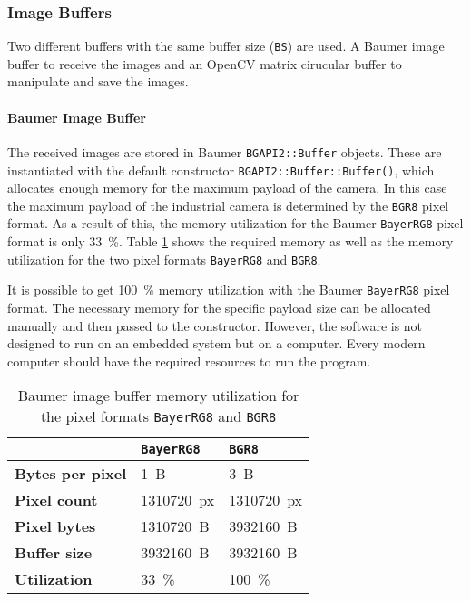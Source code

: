\subsubsection{Image Buffers}
\label{subsubsec:buffers}

Two different buffers with the same buffer size (\texttt{BS}) are used.
A Baumer image buffer to receive the images and an OpenCV matrix cirucular buffer to manipulate and save the images.

\paragraph{Baumer Image Buffer}
The received images are stored in Baumer \texttt{BGAPI2::Buffer} objects.
These are instantiated with the default constructor \texttt{BGAPI2::Buffer::Buffer()}, which allocates enough memory for the maximum payload of the camera.
In this case the maximum payload of the industrial camera is determined by the \texttt{BGR8} pixel format.
As a result of this, the memory utilization for the Baumer \texttt{BayerRG8} pixel format is only \SI{33}{\percent}.
Table \ref{tab:buffer_memory_utilization} shows the required memory as well as the memory utilization for the two pixel formats \texttt{BayerRG8} and \texttt{BGR8}.

\clearpage

It is possible to get \SI{100}{\percent} memory utilization with the Baumer \texttt{BayerRG8} pixel format.
The necessary memory for the specific payload size can be allocated manually and then passed to the constructor.
However, the software is not designed to run on an embedded system but on a computer.
Every modern computer should have the required resources to run the program.

\begin{table}[t]
  \caption{Baumer image buffer memory utilization for the pixel formats \texttt{BayerRG8} and \texttt{BGR8}}
  \label{tab:buffer_memory_utilization}
  \centering
  \begin{tabular}{lll}
    \toprule
     & \textbf{\texttt{BayerRG8}} & \textbf{\texttt{BGR8}} \\
    \midrule
    \textbf{Bytes per pixel} & \SI{1}{B} & \SI{3}{B} \\
    \textbf{Pixel count} & \SI{1310720}{px} & \SI{1310720}{px} \\
    \textbf{Pixel bytes} & \SI{1310720}{B} & \SI{3932160}{B} \\
    \textbf{Buffer size} & \SI{3932160}{B} & \SI{3932160}{B} \\
    \textbf{Utilization} & \SI{33}{\percent} & \SI{100}{\percent} \\
    \bottomrule
  \end{tabular}
\end{table}

